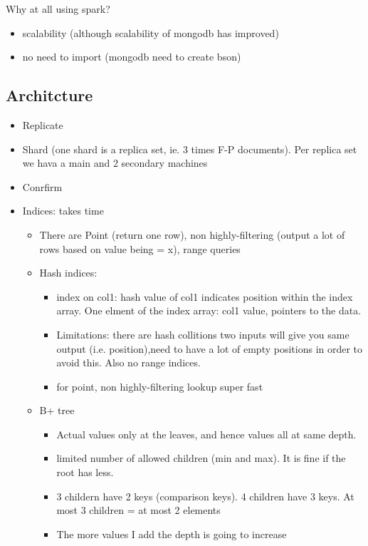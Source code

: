 Why at all using spark?
\begin{itemize}
    \item scalability (although scalability of mongodb has improved)
    \item no need to import (mongodb need to create bson)
\end{itemize}

\subsection{Architcture}
\begin{itemize}
    \item Replicate
    \item Shard (one shard is a replica set, ie. 3 times F-P documents). Per replica set we hava a main and 2 secondary machines
    \item Conrfirm
    \item Indices: takes time
    \begin{itemize}
        \item There are Point (return one row),
        non  highly-filtering (output a lot of rows based on value being = x), range queries
        \item Hash indices:
        \begin{itemize}
            \item index on col1: hash value of col1 indicates position within the index array.
            One elment of the index array: col1 value, pointers to the data.
            \item Limitations: there are hash collitions two inputs will give you same output
        (i.e. position),need to have a lot of empty positions in order to avoid this. Also no range indices.
            \item for point, non  highly-filtering lookup super fast
        \end{itemize}
        \item B+ tree
        \begin{itemize}
            \item Actual values only at the leaves, and hence values all at same depth.
            \item limited number of allowed children (min and max). It is fine if the root has less.
            \item 3 childern have 2 keys (comparison keys). 4 children have 3 keys. At most 3 children = at most 2 elements
            \item The more values I add the depth is going to increase

\end{itemize}
\end{itemize}
\end{itemize}
